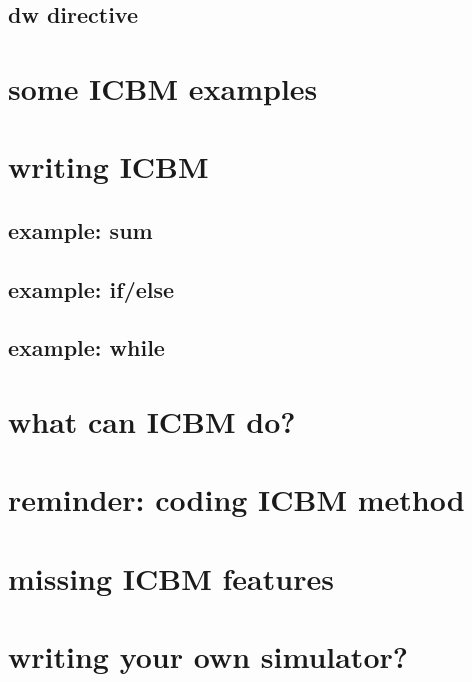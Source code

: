 \subsection{dw directive}

\section{some ICBM examples}

\section{writing ICBM}


\subsection{example: sum}

\subsection{example: if/else}

\subsection{example: while}

\section{what can ICBM do?}


\section{reminder: coding ICBM method}



\section{missing ICBM features}

\section{writing your own simulator?}

